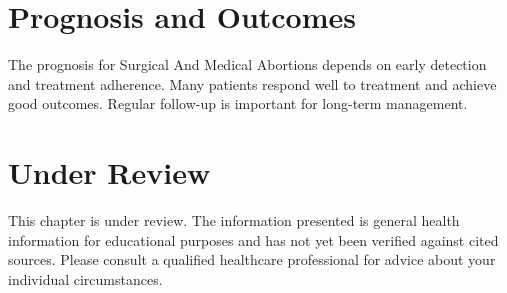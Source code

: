 \section*{Prognosis and Outcomes}
The prognosis for Surgical And Medical Abortions depends on early detection and treatment adherence. Many patients respond well to treatment and achieve good outcomes. Regular follow-up is important for long-term management.
\section*{Under Review}
This chapter is under review. The information presented is general health information for educational purposes and has not yet been verified against cited sources. Please consult a qualified healthcare professional for advice about your individual circumstances.


\clearpage
